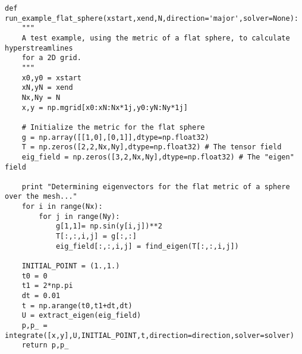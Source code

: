\documentclass[main.tex]{subfiles}
\begin{document}
\lstset{style=Python}
\begin{lstlisting}
def run_example_flat_sphere(xstart,xend,N,direction='major',solver=None):
    """
    A test example, using the metric of a flat sphere, to calculate hyperstreamlines
    for a 2D grid.
    """ 
    x0,y0 = xstart
    xN,yN = xend
    Nx,Ny = N
    x,y = np.mgrid[x0:xN:Nx*1j,y0:yN:Ny*1j]
    
	# Initialize the metric for the flat sphere
    g = np.array([[1,0],[0,1]],dtype=np.float32)
    T = np.zeros([2,2,Nx,Ny],dtype=np.float32) # The tensor field
    eig_field = np.zeros([3,2,Nx,Ny],dtype=np.float32) # The "eigen" field

    print "Determining eigenvectors for the flat metric of a sphere over the mesh..."
    for i in range(Nx):
        for j in range(Ny):
            g[1,1]= np.sin(y[i,j])**2
            T[:,:,i,j] = g[:,:]
            eig_field[:,:,i,j] = find_eigen(T[:,:,i,j])

    INITIAL_POINT = (1.,1.)
    t0 = 0
    t1 = 2*np.pi
    dt = 0.01  
    t = np.arange(t0,t1+dt,dt)   
    U = extract_eigen(eig_field)
    p,p_ = integrate([x,y],U,INITIAL_POINT,t,direction=direction,solver=solver)
    return p,p_
\end{lstlisting}
\end{document}
